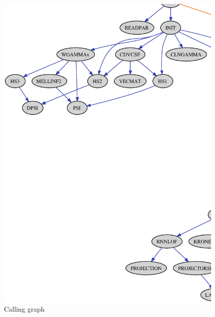 \documentclass[12pt]{article}
\begin{document}
\begin{figure}[ht]
\begin{center}
\includegraphics[scale=0.52]{callgraph}
\end{center}
\caption{Calling graph}
\label{fig:callgraph}
\end{figure}




%

%

\end{document}
